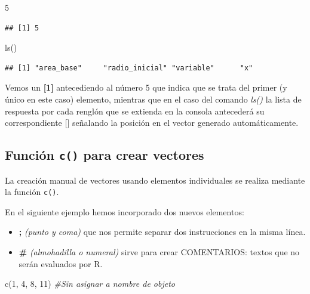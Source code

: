 \documentclass[
]{book}
\newenvironment{Shaded}{\begin{snugshade}}{\end{snugshade}}
\newcommand{\CommentTok}[1]{\textcolor[rgb]{0.56,0.35,0.01}{\textit{#1}}}
\newcommand{\DecValTok}[1]{\textcolor[rgb]{0.00,0.00,0.81}{#1}}
\newcommand{\FunctionTok}[1]{\textcolor[rgb]{0.00,0.00,0.00}{#1}}
\newcommand{\NormalTok}[1]{#1}
\providecommand{\tightlist}{%
  \setlength{\itemsep}{0pt}\setlength{\parskip}{0pt}}
\begin{document}
\begin{Shaded}
\begin{Highlighting}[]
\DecValTok{5}
\end{Highlighting}
\end{Shaded}

\begin{verbatim}
## [1] 5
\end{verbatim}

\begin{Shaded}
\begin{Highlighting}[]
\FunctionTok{ls}\NormalTok{()}
\end{Highlighting}
\end{Shaded}

\begin{verbatim}
## [1] "area_base"     "radio_inicial" "variable"      "x"
\end{verbatim}

Vemos un \textbf{{[}1{]}} antecediendo al número 5 que indica que se trata del primer (y único en este caso) elemento, mientras que en el caso del comando \emph{ls()} la lista de respuesta por cada renglón que se extienda en la consola antecederá su correspondiente {[}{]} señalando la posición en el vector generado automáticamente.

\hypertarget{fun-c}{%
\subsection{\texorpdfstring{Función \textbf{\texttt{c()}} para crear vectores}{Función c() para crear vectores}}\label{fun-c}}

La creación manual de vectores usando elementos individuales se realiza mediante la función \texttt{c()}.

En el siguiente ejemplo hemos incorporado dos nuevos elementos:

\begin{itemize}
\tightlist
\item
  \textbf{;} \emph{(punto y coma)} que nos permite separar dos instrucciones en la misma línea.
\item
  \textbf{\#} \emph{(almohadilla o numeral)} sirve para crear COMENTARIOS: textos que no serán evaluados por R.
\end{itemize}

\begin{Shaded}
\begin{Highlighting}[]
\FunctionTok{c}\NormalTok{(}\DecValTok{1}\NormalTok{, }\DecValTok{4}\NormalTok{, }\DecValTok{8}\NormalTok{, }\DecValTok{11}\NormalTok{) }\CommentTok{\#Sin asignar a nombre de objeto}
\end{Highlighting}
\end{Shaded}
\end{document}
